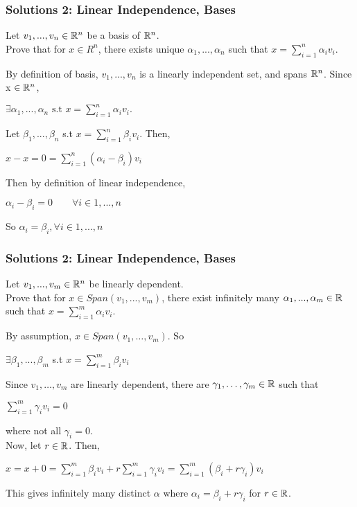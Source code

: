 \documentclass{beamer}
\newcommand\fonteight{\fontsize{8}{9.6}\selectfont}
\renewenvironment{enumerate}%
{\begin{list}{\arabic{enumi}.}%
      {\setlength{\leftmargin}{2.5em}%
       \setlength{\itemsep}{-\parsep}%
       \setlength{\topsep}{-\parskip}%
       \usecounter{enumi}}%
 }{\end{list}}
\begin{document}
\begin{frame}
\frametitle{Solutions 2: Linear Independence, Bases}
\begin{enumerate}
	\item[2.] Let $v_1,...,v_n \in \mathbb{R}^n$ be a basis of $\mathbb{R}^n$. \\
		Prove that for $x \in R^n$, there exists unique $\alpha_1,...,\alpha_n$
		such that $x = \sum_{i=1}^n \alpha_i v_i$.
	\begin{solution}
	By definition of basis, $v_1,...,v_n$ is a linearly independent set, and spans $\mathbb{R}^n$. Since x $\in \mathbb{R}^n$, 
	\begin{center}
		$\exists \alpha_1,...,\alpha_n \text{ s.t } x = \sum_{i=1}^n \alpha_i v_i.$ 
	\end{center}
	Let $\beta_1,...,\beta_n$ s.t $x = \sum_{i=1}^n \beta_i v_i$. Then,
	\begin{center}
		$x-x=0=\sum_{i=1}^n (\alpha_i-\beta_i) v_i$
	\end{center} 
	Then by definition of linear independence, 
	\begin{center}
		$\alpha_i-\beta_i=0  \qquad \forall i \in 1,...,n$
	\end{center}
	So $\alpha_i=\beta_i, \forall i \in 1,...,n$ 
	\end{solution}
\end{enumerate}
\end{frame}

\begin{frame}
\frametitle{Solutions 2: Linear Independence, Bases}
\begin{enumerate}
\item[3.] Let $v_1,...,v_m \in \mathbb{R}^n$ be linearly dependent. \\
Prove that for $x \in Span(v_1,...,v_m)$, 
there exist infinitely many $\alpha_1,...,\alpha_m \in \mathbb{R}$ 
such that $x = \sum_{i=1}^m \alpha_i v_i$.
\begin{solution}
    \fonteight
    By assumption, $x\in Span(v_1,\ldots,v_m)$. So
    \begin{center}
    $\exists \beta_1,...,\beta_m$ s.t $x=\sum_{i=1}^m \beta_iv_i$
    \end{center}
    
    Since $v_1,\ldots,v_m$ are linearly dependent, there are $\gamma_1,\ldots,\gamma_m\in \mathbb{R}$ such that
    \begin{center} $\sum_{i=1}^m\gamma_i v_i= 0$ \end{center}
    where not all $\gamma_i=0$.  \\
    Now, let $r \in \mathbb{R}$. Then,
    \begin{center} $x = x+0 = \sum_{i=1}^m \beta_iv_i + r\sum_{i=1}^m\gamma_i v_i
    =  \sum_{i=1}^m (\beta_i +r\gamma_i)v_i $ \end{center} 
    This gives infinitely many distinct $\alpha$ where $\alpha_i=\beta_i+r\gamma_i$ for $r\in\mathbb{R}$.

\end{solution}
\end{enumerate}
\end{frame}
\end{document}
